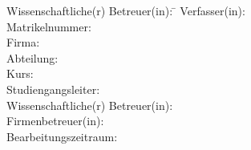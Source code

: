 \begin{titlepage}
\begin{center}
        \begin{minipage}{\textwidth}
            \begin{tabbing}
            Wissenschaftliche(r) Betreuer(in): \hspace{0.85cm}\=\kill
            Verfasser(in): \> \TheAuthor \\[1.5mm]
            Matrikelnummer: \> \TheMatriculationNumber \\[1.5mm]
            Firma: \> \TheCompany  \\[1.5mm]
            Abteilung: \> \TheDepartment \\[1.5mm]
            Kurs: \> \TheCourse \\[1.5mm]
            Studiengangsleiter: \> \TheCourseDirector \\[1.5mm]
            Wissenschaftliche(r) Betreuer(in): \> \TheScientificSupervisor \\[1.5mm]
            Firmenbetreuer(in): \> \TheCompanySupervisor \\[1.5mm]
            Bearbeitungszeitraum: \> \TheProcessingPeriod\\[1.5mm]
            \end{tabbing}
        \end{minipage}
    \end{center}
\end{titlepage}